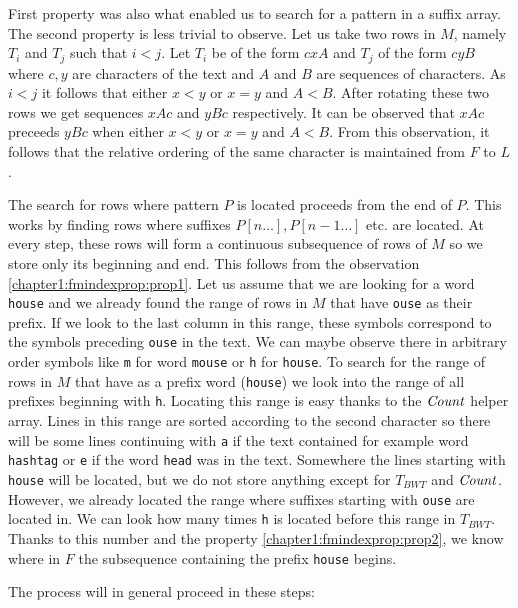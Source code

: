 First property was also what enabled us to search for a pattern in a suffix array. The second
property is less trivial to observe. Let us take two rows in $M$, namely $T_i$ and $T_j$
such that $i<j$. Let $T_i$ be of the form $cxA$ and $T_j$ of the form $cyB$ where $c, y$ are
characters of the text and $A$ and $B$ are sequences of characters. As $i<j$ it follows that
either $x<y$ or $x=y$ and $A<B$. After rotating these two rows we get sequences $xAc$ and $yBc$
respectively. It can be observed that $xAc$ preceeds $yBc$ when either $x<y$ or $x=y$ and $A<B$.
From this observation, it follows that the relative ordering of the same character is maintained
from $F$ to $L$.

The search for rows where pattern $P$ is located proceeds from the end of $P$. This works by
finding rows where suffixes $P[n\ldots], P[n-1\ldots]$ etc. are located. At every step, these
rows will form a continuous subsequence of rows of $M$ so we store only its beginning and end.
This follows from the observation \ref{chapter1:fmindexprop:prop1}. Let us assume that we are
looking for a word {\tt house} and we already found the range of rows in $M$ that have {\tt ouse}
as their prefix. If we look to the last column in this range, these symbols correspond to the symbols
preceding {\tt ouse} in the text. We can maybe observe there in arbitrary order symbols like {\tt m}
for word {\tt mouse} or {\tt h} for {\tt house}. To search for the range of rows in $M$ that have as a prefix
word ({\tt house}) we look into the range of all prefixes beginning with {\tt h}. Locating this
range is easy thanks to the $\mathit{Count}$ helper array. Lines in this range are sorted according to the
second character so there will be some lines continuing with {\tt a} if the text contained for example
word {\tt hashtag} or {\tt e} if the word {\tt head} was in the text. Somewhere the lines starting with 
{\tt house} will be located, but we do not store anything except for $T_{BWT}$ and $\mathit{Count}$.
However, we already located the range where suffixes starting with {\tt ouse} are located in.
We can look how many times {\tt h} is located before this range in $T_{BWT}$. Thanks to this
number and the property \ref{chapter1:fmindexprop:prop2}, we know where in $F$ the subsequence
containing the prefix {\tt house} begins.


The process will in general proceed in these steps:

